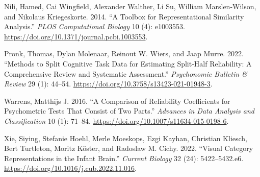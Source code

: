 \documentclass[
  letterpaper,
  DIV=11,
  numbers=noendperiod]{scrartcl}
\newlength{\cslhangindent}
\newlength{\cslentryspacingunit} %
\newenvironment{CSLReferences}[2] %
 {%
  \setlength{\parindent}{0pt}
  \ifodd #1
  \let\oldpar\par
  \def\par{\hangindent=\cslhangindent\oldpar}
  \fi
  \setlength{\parskip}{#2\cslentryspacingunit}
 }%
 {}
\begin{document}
\begin{CSLReferences}{1}{0}
\leavevmode{}%
Nili, Hamed, Cai Wingfield, Alexander Walther, Li Su, William
Marslen-Wilson, and Nikolaus Kriegeskorte. 2014. {``A Toolbox for
Representational Similarity Analysis.''} \emph{PLOS Computational
Biology} 10 (4): e1003553.
\url{https://doi.org/10.1371/journal.pcbi.1003553}.

\leavevmode{}%
Pronk, Thomas, Dylan Molenaar, Reinout W. Wiers, and Jaap Murre. 2022.
{``Methods to Split Cognitive Task Data for Estimating Split-Half
Reliability: A Comprehensive Review and Systematic Assessment.''}
\emph{Psychonomic Bulletin \& Review} 29 (1): 44--54.
\url{https://doi.org/10.3758/s13423-021-01948-3}.

\leavevmode{}%
Warrens, Matthijs J. 2016. {``A Comparison of Reliability Coefficients
for Psychometric Tests That Consist of Two Parts.''} \emph{Advances in
Data Analysis and Classification} 10 (1): 71--84.
\url{https://doi.org/10.1007/s11634-015-0198-6}.

\leavevmode{}%
Xie, Siying, Stefanie Hoehl, Merle Moeskops, Ezgi Kayhan, Christian
Kliesch, Bert Turtleton, Moritz Köster, and Radoslaw M. Cichy. 2022.
{``Visual Category Representations in the Infant Brain.''} \emph{Current
Biology} 32 (24): 5422--5432.e6.
\url{https://doi.org/10.1016/j.cub.2022.11.016}.

\end{CSLReferences}
\end{document}
